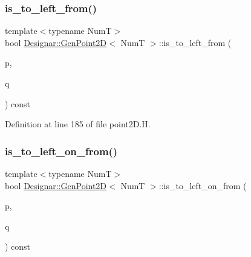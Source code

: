 \mbox{\label{class_designar_1_1_gen_point2_d_a1313b28156494163cdbf421e4cfc264e}} 
\subsubsection{\texorpdfstring{is\+\_\+to\+\_\+left\+\_\+from()}{is\_to\_left\_from()}}
{\footnotesize\ttfamily template$<$typename NumT$>$ \\
bool \hyperlink{class_designar_1_1_gen_point2_d}{Designar\+::\+Gen\+Point2D}$<$ NumT $>$\+::is\+\_\+to\+\_\+left\+\_\+from (\begin{DoxyParamCaption}\item[{const \hyperlink{class_designar_1_1_gen_point2_d}{Gen\+Point2D}$<$ NumT $>$ \&}]{p,  }\item[{const \hyperlink{class_designar_1_1_gen_point2_d}{Gen\+Point2D}$<$ NumT $>$ \&}]{q }\end{DoxyParamCaption}) const\hspace{0.3cm}{\ttfamily [inline]}}



Definition at line 185 of file point2\+D.\+H.

\mbox{\label{class_designar_1_1_gen_point2_d_af23c6b5033a1e261288d0ba9185f2d53}} 
\subsubsection{\texorpdfstring{is\+\_\+to\+\_\+left\+\_\+on\+\_\+from()}{is\_to\_left\_on\_from()}}
{\footnotesize\ttfamily template$<$typename NumT$>$ \\
bool \hyperlink{class_designar_1_1_gen_point2_d}{Designar\+::\+Gen\+Point2D}$<$ NumT $>$\+::is\+\_\+to\+\_\+left\+\_\+on\+\_\+from (\begin{DoxyParamCaption}\item[{const \hyperlink{class_designar_1_1_gen_point2_d}{Gen\+Point2D}$<$ NumT $>$ \&}]{p,  }\item[{const \hyperlink{class_designar_1_1_gen_point2_d}{Gen\+Point2D}$<$ NumT $>$ \&}]{q }\end{DoxyParamCaption}) const\hspace{0.3cm}{\ttfamily [inline]}}



